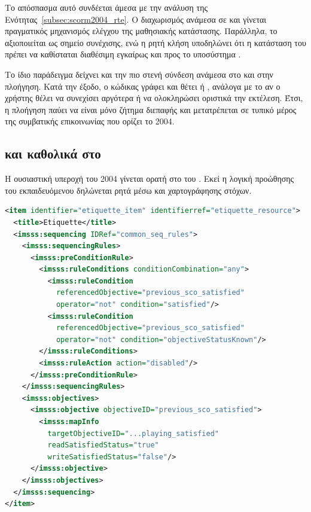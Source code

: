 Το απόσπασμα αυτό συνδέεται άμεσα με την ανάλυση της Ενότητας~\ref{subsec:scorm2004_rte}. Ο διαχωρισμός ανάμεσα σε  και  γίνεται πραγματικός μηχανισμός ελέγχου της μαθησιακής κατάστασης. Παράλληλα, το  αξιοποιείται ως σημείο συνέχισης, ενώ η ρητή κλήση  υποδηλώνει ότι η κατάσταση του  πρέπει να καθίσταται διαθέσιμη εγκαίρως και προς το υποσύστημα .

Το ίδιο παράδειγμα δείχνει και την πιο στενή σύνδεση ανάμεσα στο  και στην πλοήγηση. Κατά την έξοδο, ο κώδικας γράφει  και θέτει  ή , ανάλογα με το αν ο χρήστης θέλει να συνεχίσει αργότερα ή να ολοκληρώσει οριστικά την εκτέλεση. Έτσι, η πλοήγηση παύει να είναι μόνο ζήτημα διεπαφής  και μετατρέπεται σε τυπικό μέρος της συμβατικής επικοινωνίας που ορίζει το  2004.

\subsection{ και καθολικά  στο }
\label{subsec:scorm2004_sequencing}

Η ουσιαστική υπεροχή του  2004 γίνεται ορατή στο  του . Εκεί η λογική προώθησης του εκπαιδευόμενου δηλώνεται ρητά μέσω  και χαρτογράφησης στόχων.

{\selectfont
\begin{lstlisting}[language=XML, caption={Κανόνας \ENG{forced sequential} στο \ENG{SCORM} 2004 \ENG{manifest}}, label={lst:ch4_scorm2004_sequencing}]
<item identifier="etiquette_item" identifierref="etiquette_resource">
  <title>Etiquette</title>
  <imsss:sequencing IDRef="common_seq_rules">
    <imsss:sequencingRules>
      <imsss:preConditionRule>
        <imsss:ruleConditions conditionCombination="any">
          <imsss:ruleCondition
            referencedObjective="previous_sco_satisfied"
            operator="not" condition="satisfied"/>
          <imsss:ruleCondition
            referencedObjective="previous_sco_satisfied"
            operator="not" condition="objectiveStatusKnown"/>
        </imsss:ruleConditions>
        <imsss:ruleAction action="disabled"/>
      </imsss:preConditionRule>
    </imsss:sequencingRules>
    <imsss:objectives>
      <imsss:objective objectiveID="previous_sco_satisfied">
        <imsss:mapInfo
          targetObjectiveID="...playing_satisfied"
          readSatisfiedStatus="true"
          writeSatisfiedStatus="false"/>
      </imsss:objective>
    </imsss:objectives>
  </imsss:sequencing>
</item>
\end{lstlisting}
}

